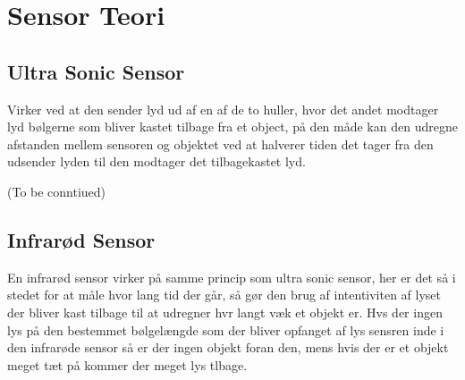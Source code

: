 \chapter{Sensor Teori}
\section{Ultra Sonic Sensor}
Virker ved at den sender lyd ud af en af de to huller, hvor det andet modtager
lyd bølgerne som bliver kastet tilbage fra et object, på den måde kan den
udregne afstanden mellem sensoren og objektet ved at halverer tiden det tager
fra den udsender lyden til den modtager det tilbagekastet lyd.

(To be conntiued)

\section{Infrarød Sensor}
En infrarød sensor virker på samme princip som ultra sonic sensor, her er det så
i stedet for at måle hvor lang tid der går, så gør den brug af intentiviten af
lyset der bliver kast tilbage til at udregner hvr langt væk et objekt er. Hvs
der ingen lys på den bestemmet bølgelængde som der bliver opfanget af lys
sensren inde i den infrarøde sensor så er der ingen objekt foran den, mens hvis
der er et objekt meget tæt på kommer der meget lys tlbage. 









